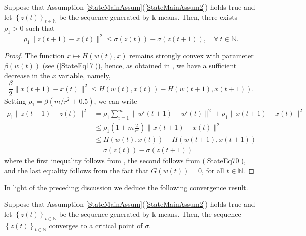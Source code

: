 \begin{proposition} \label{k_means_SDP}
Suppose that Assumption \ref{StateMainAssum}(\ref{StateMainAssum2}) holds true and let $\left\lbrace z(t) \right\rbrace_{t \in \mathbb{N}}$ be the sequence generated by k-means. Then, there exists $\rho_1 > 0$ such that 
\begin{equation*}
	\rho_1 \|z(t+1) - z(t)\|^2 \leq \sigma(z(t)) - \sigma(z(t+1)), \quad \forall \: t \in \mathbb{N} .
\end{equation*}
\end{proposition}

\begin{proof}
The function $x \mapsto H(w(t),x)$ remains strongly convex with parameter $\beta(w(t))$ (see (\ref{StateEq17})), hence, as obtained in  , we have a sufficient decrease in the $x$ variable, namely,
\begin{equation}
	\frac{\underline{\beta}}{2} \|x(t+1)-x(t)\|^2 \leq H(w(t),x(t)) - H(w(t+1),x(t+1)) . \label{StateEq70}
\end{equation}
Setting $\rho_1 = \underline{\beta} \left(m/r^2 + 0.5\right)$, we can write
\begin{align*}
	\rho_1 \|z(t+1)-z(t)\|^2 &= \rho_1 \sum\limits_{i=1}^{m} \|w^i(t+1)-w^i(t)\|^2 + \rho_1 \|x(t+1)-x(t)\|^2 \\
	&\leq \rho_1 \left(1 + m\frac{2}{r^2}\right) \|x(t+1) - x(t)\|^2 \\
	&\leq H(w(t),x(t)) - H(w(t+1),x(t+1)) \\
	&= \sigma(z(t)) - \sigma(z(t+1))
\end{align*}
where the first inequality follows from , the second follows from (\ref{StateEq70}), and the last equality follows from the fact that $G(w(t))=0$, for all $t \in \mathbb{N}$.
\end{proof}

In light of the preceding discussion we deduce the following convergence result.

\begin{theorem}
Suppose that Assumption \ref{StateMainAssum}(\ref{StateMainAssum2}) holds true and let $\left\lbrace z(t) \right\rbrace_{t \in \mathbb{N}}$ be the sequence generated by k-means. Then, the sequence $\left\lbrace z(t) \right\rbrace_{t \in \mathbb{N}}$ converges to a critical point of $\sigma$.
\end{theorem}

